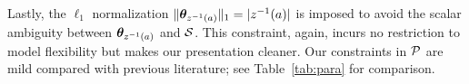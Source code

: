 \documentclass[journal]{IEEEtran}
\theoremstyle{definition}
\theoremstyle{definition}
\begin{document}
Lastly, the $\ell_1$ normalization $\lVert\boldsymbol{\theta}_{z^{-1}(a)}\rVert_1=|z^{-1}(a)|$ is imposed to avoid the scalar ambiguity between $\boldsymbol{\theta}_{z^{-1}(a)}$ and $\mathcal{S}$. This constraint, again, incurs no restriction to model flexibility but makes our presentation cleaner.   {Our constraints in $\mathcal{P}$ are mild compared with previous literature; see Table~\ref{tab:para} for comparison.} 
\end{document}
